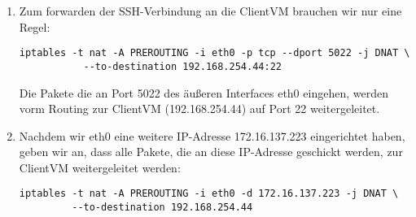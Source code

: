\documentclass{scrartcl}
\begin{document}
\begin{enumerate}[\bfseries 1.]
	\item
        Zum forwarden der SSH-Verbindung an die ClientVM brauchen wir nur eine Regel:
        \begin{lstlisting}
iptables -t nat -A PREROUTING -i eth0 -p tcp --dport 5022 -j DNAT \
           --to-destination 192.168.254.44:22
		\end{lstlisting}
		Die Pakete die an Port 5022 des äußeren Interfaces eth0 eingehen, werden vorm
		Routing zur ClientVM (192.168.254.44) auf Port 22 weitergeleitet.

	\item
        Nachdem wir eth0 eine weitere IP-Adresse 172.16.137.223 eingerichtet haben,
		geben wir an, dass alle Pakete, die an diese IP-Adresse geschickt werden,
		zur ClientVM weitergeleitet werden:
		\begin{lstlisting}
iptables -t nat -A PREROUTING -i eth0 -d 172.16.137.223 -j DNAT \
         --to-destination 192.168.254.44
		\end{lstlisting}
\end{enumerate}
\end{document}
